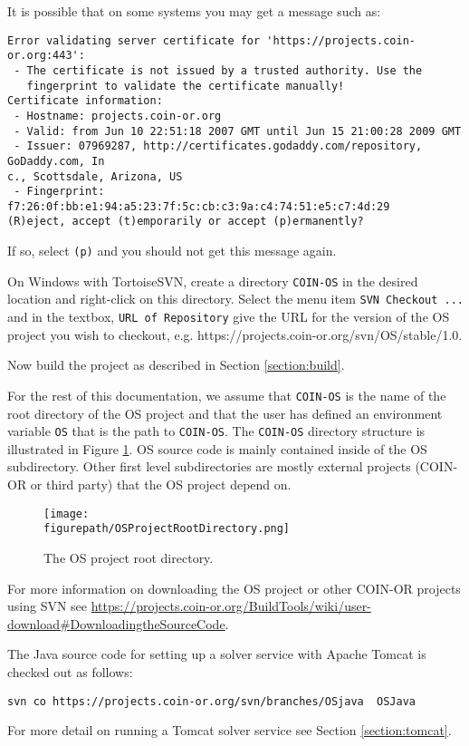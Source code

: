 \documentclass[11pt]{article}
\newcommand{\figurepath}{./figures}
\newcounter{Fig}
\renewcommand{\_}{{\char"5F}}
\renewcommand{\{}{{\char"7B}}
\renewcommand{\}}{{\char"7D}}
\renewcommand{\^}{{\char"0D}}
\renewcommand{\'}{{\char"0D}}
\begin{document}
It is possible that on some systems you may get a message such as:
\begin{verbatim}
Error validating server certificate for 'https://projects.coin-or.org:443':
 - The certificate is not issued by a trusted authority. Use the
   fingerprint to validate the certificate manually!
Certificate information:
 - Hostname: projects.coin-or.org
 - Valid: from Jun 10 22:51:18 2007 GMT until Jun 15 21:00:28 2009 GMT
 - Issuer: 07969287, http://certificates.godaddy.com/repository, GoDaddy.com, In
c., Scottsdale, Arizona, US
 - Fingerprint: f7:26:0f:bb:e1:94:a5:23:7f:5c:cb:c3:9a:c4:74:51:e5:c7:4d:29
(R)eject, accept (t)emporarily or accept (p)ermanently?
\end{verbatim}

If so, select {\tt (p)} and you should not get this message again.

On Windows with TortoiseSVN, create a directory {\tt COIN-OS} in the desired location and right-click on this directory.   Select the menu item {\tt SVN Checkout ...} and in the textbox, {\tt URL of Repository}
give the URL for the version of the OS project you wish to checkout, e.g. https://projects.coin-or.org/svn/OS/stable/1.0.


Now build the project as described in  Section \ref{section:build}.

For the rest of this documentation, we assume that  {\tt COIN-OS} is the name of the root directory of the OS project and that the user has defined an environment variable {\tt OS} that is the path to {\tt COIN-OS}.  The {\tt COIN-OS} directory structure is illustrated in Figure \ref{figure:osprojectrootdir}. OS source code is mainly contained inside of the OS subdirectory. Other first level subdirectories are mostly external projects (COIN-OR or third party) that the OS project depend on.


\begin{figure}
\centering
\texttt{[image: \\figurepath/OSProjectRootDirectory.png]}
\caption{The OS project root directory.}
\label{figure:osprojectrootdir}
\end{figure}

For more information on downloading the OS project or other COIN-OR projects using SVN see \url{https://projects.coin-or.org/BuildTools/wiki/user-download#DownloadingtheSourceCode}.

The Java source code for  setting up a solver service with Apache Tomcat is checked out as follows:
\begin{verbatim}
svn co https://projects.coin-or.org/svn/branches/OSjava  OSJava
\end{verbatim}
For more detail on running a Tomcat solver service  see  Section \ref{section:tomcat}.
\end{document}
